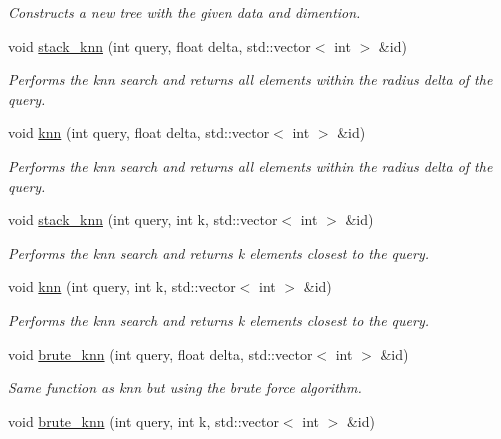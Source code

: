 \begin{DoxyCompactItemize}
\begin{DoxyCompactList}\small\item\em Constructs a new tree with the given data and dimention. \end{DoxyCompactList}\item 
void \hyperlink{classtree_1_1cpu_1_1vp__tree_a5490fe2b15df7311f16893fe77f2387c}{stack\+\_\+knn} (int query, float delta, std\+::vector$<$ int $>$ \&id)
\begin{DoxyCompactList}\small\item\em Performs the knn search and returns all elements within the radius delta of the query. \end{DoxyCompactList}\item 
void \hyperlink{classtree_1_1cpu_1_1vp__tree_ab2956b54f9bfae552ee353b63b518d9f}{knn} (int query, float delta, std\+::vector$<$ int $>$ \&id)
\begin{DoxyCompactList}\small\item\em Performs the knn search and returns all elements within the radius delta of the query. \end{DoxyCompactList}\item 
void \hyperlink{classtree_1_1cpu_1_1vp__tree_a53834f76cd09227d0a094392c90f3a06}{stack\+\_\+knn} (int query, int k, std\+::vector$<$ int $>$ \&id)
\begin{DoxyCompactList}\small\item\em Performs the knn search and returns k elements closest to the query. \end{DoxyCompactList}\item 
void \hyperlink{classtree_1_1cpu_1_1vp__tree_a42daa91934422c544b2d3234d6f4b4c1}{knn} (int query, int k, std\+::vector$<$ int $>$ \&id)
\begin{DoxyCompactList}\small\item\em Performs the knn search and returns k elements closest to the query. \end{DoxyCompactList}\item 
\hypertarget{classtree_1_1cpu_1_1vp__tree_a6b4257008f872348b15ec221b6e74348}{}void \hyperlink{classtree_1_1cpu_1_1vp__tree_a6b4257008f872348b15ec221b6e74348}{brute\+\_\+knn} (int query, float delta, std\+::vector$<$ int $>$ \&id)\label{classtree_1_1cpu_1_1vp__tree_a6b4257008f872348b15ec221b6e74348}

\begin{DoxyCompactList}\small\item\em Same function as knn but using the brute force algorithm. \end{DoxyCompactList}\item 
\hypertarget{classtree_1_1cpu_1_1vp__tree_a417aef52e44c4b1f8b5d778e8e251be3}{}void \hyperlink{classtree_1_1cpu_1_1vp__tree_a417aef52e44c4b1f8b5d778e8e251be3}{brute\+\_\+knn} (int query, int k, std\+::vector$<$ int $>$ \&id)\label{classtree_1_1cpu_1_1vp__tree_a417aef52e44c4b1f8b5d778e8e251be3}


\end{DoxyCompactItemize}
